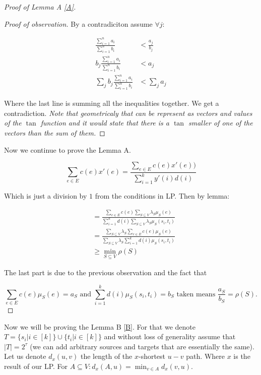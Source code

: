 \begin{proof}[Proof of Lemma A \ref{A}]
	\begin{proof}[Proof of observation]
		By a contradiciton assume $\forall j:$
		
		$$
		\begin{aligned}
			\frac{\sum_{i = 1}^{n} a_{i}}{\sum_{i = 1}^{n} b_{i}} &< \frac{a_{j}}{b_{j}}\\
			b_{j} \frac{\sum_{i = 1}^{n} a_{i}}{\sum_{i = 1}^{n} b_{i}} &< a_{j}\\
			\sum_{j} b_{j} \frac{\sum_{i = 1}^{n} a_{i}}{\sum_{i = 1}^{n} b_{i}} &< \sum_{j} a_{j}
		\end{aligned}
		$$
		
		Where the last line is summing all the inequalities together. We get a contradiction. \textit{Note that geometricaly that can be represent as vectors and values of the $\tan$ function and it would state that there is a $\tan$ smaller of one of the vectors than the sum of them.}
	\end{proof}
	
	Now we continue to prove the Lemma A.
	
	$$
	\sum_{e \in E} c(e) x'(e) = \frac{\sum_{e \in E}c(e) x'(e))}{\sum_{i = 1}^{k}y'(i) d(i)}
	$$
	
	Which is just a division by $1$ from the conditions in LP. Then by lemma:
	
	$$
	\begin{aligned}
		& = \frac{\sum_{e \in E} c(e) \sum_{S \subseteq V} \lambda_{S} \mu_{S}(e)}{\sum_{i =1}^{k} d(i) \sum_{S \subseteq V} \lambda_{S} \mu_{S}(s_{i},t_{i})}\\
		&= \frac{\sum_{S \subseteq V} \lambda_{S} \sum_{e \in E} c(e) \mu_{S}(e)}{\sum_{S \subseteq V} \lambda_{S} \sum_{i =1}^{k} d(i)  \mu_{S}(s_{i},t_{i})}\\
		&\geq \min_{S \subseteq V} \rho(S)
	\end{aligned}
	$$
	
	The last part is due to the previous observation and the fact that

	$$
	\sum_{e \in E} c(e) \mu_{S}(e) = a_{S} \text{ and } \sum_{i =1}^{k} d(i)  \mu_{S}(s_{i},t_{i}) = b_{S} \text{ taken means } \frac{a_{S}}{b_{S}} = \rho(S).
	$$
\end{proof}

Now we will be proving the Lemma B \ref{B}. For that we denote $T = \{s_{i} | i \in [k]\} \cup \{t_{i}| i \in [k]\}$ and without loss of generality assume that $|T| = 2^{\tau}$ (we can add arbitrary sources and targets that are essentially the same). Let us denote $d_{x} (u,v)$ the length of the $x$-shortest $u-v$ path. Where $x$ is the result of our LP. For $A \subseteq V: d_{x}(A,u) = \min_{v \in A} d_{x}(v,u)$.

